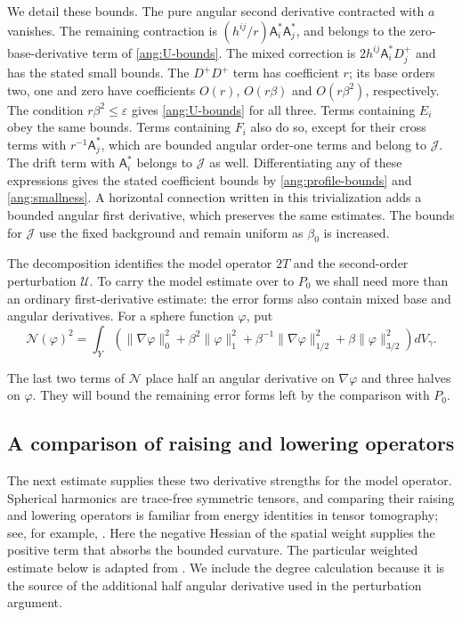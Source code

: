 We detail these bounds.  The pure angular second derivative contracted
with $a$ vanishes.  The remaining contraction is
$(h^{ij}/r)\mathsf A_i^*\mathsf A_j^*$, and belongs to the zero-base-derivative term of
\eqref{ang:U-bounds}.  The mixed correction is
$2h^{ij}\mathsf A_i^*D_j^+$ and has the stated small bounds.  The $D^+D^+$ term
has coefficient $r$; its base orders two, one and zero have coefficients
$O(r)$, $O(r\beta)$ and $O(r\beta^2)$, respectively.  The condition
$r\beta^2\le\varepsilon$ gives \eqref{ang:U-bounds} for all three.
Terms containing $E_i$ obey the same bounds.  Terms containing $F_i$
also do so, except for their cross terms with $r^{-1}\mathsf A_j^*$, which are
bounded angular order-one terms and belong to $\mathcal J$.  The drift term with
$\mathsf A_i^*$ belongs to $\mathcal J$ as well.  Differentiating any of these expressions
gives the stated coefficient bounds by
\eqref{ang:profile-bounds} and \eqref{ang:smallness}.
A horizontal connection written in this trivialization adds a bounded
angular first derivative, which preserves the same estimates.  The bounds
for $\mathcal J$ use the fixed background and remain uniform as $\beta_0$ is
increased.

The decomposition identifies the model operator $2T$ and the
second-order perturbation $\mathcal U$.  To carry the model estimate over to $P_0$
we shall need more than an ordinary first-derivative estimate: the error forms
also contain mixed base and angular derivatives.  For a sphere function
$\varphi$, put
\begin{equation}\label{ang:N-definition}
 \mathcal N(\varphi)^2
 =\int_Y\left(
  \|\nabla\varphi\|_0^2+\beta^2\|\varphi\|_1^2
  +\beta^{-1}\|\nabla\varphi\|_{1/2}^2
  +\beta\|\varphi\|_{3/2}^2\right)dV_\gamma.
\end{equation}

The last two terms of $\mathcal N$ place half an angular derivative
on $\nabla\varphi$ and three halves on $\varphi$.  They will bound the
remaining error forms left by the comparison with $P_0$.

\subsection{A comparison of raising and lowering operators}

The next estimate supplies these two derivative strengths for the model
operator.  Spherical harmonics are trace-free symmetric tensors, and
comparing their raising and lowering operators is familiar from energy
identities in tensor tomography; see, for example, \cite{PSU15,GPSU16}.
Here the negative Hessian of the spatial weight supplies the positive
term that absorbs the bounded curvature.  The particular weighted estimate below is adapted from
\citet[Section~5, weighted raising estimate]{ScalarCompanion2026}.
We include the degree calculation because it is the source of the
additional half angular derivative used in the perturbation argument.

